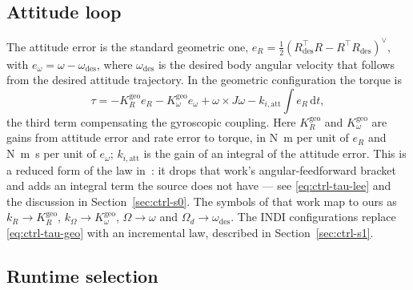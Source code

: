 \subsection{Attitude loop}

The attitude error is the standard geometric one,
$e_R = \tfrac{1}{2}\left(R_{\mathrm{des}}^\top R - R^\top R_{\mathrm{des}}\right)^\vee$, with
$e_\omega = \omega - \omega_{\mathrm{des}}$, where $\omega_{\mathrm{des}}$ is the desired body angular
velocity that follows from the desired attitude trajectory. In the geometric configuration the torque is
%
\begin{equation}
  \tau = -K_R^{\mathrm{geo}} e_R - K_\omega^{\mathrm{geo}} e_\omega + \omega \times J\omega
         - k_{i,\mathrm{att}} \textstyle\int e_R \, \mathrm{d}t,
  \label{eq:ctrl-tau-geo}
\end{equation}
%
the third term compensating the gyroscopic coupling. Here $K_R^{\mathrm{geo}}$ and
$K_\omega^{\mathrm{geo}}$ are gains from attitude error and rate error to torque, in
\si{\newton\metre} per unit of $e_R$ and \si{\newton\metre\second} per unit of $e_\omega$; $k_{i,\mathrm{att}}$ is the gain of an
integral of the attitude error. This is a reduced form of the law
in~\cite{lee2010geometrictracking}: it drops that work's angular-feedforward bracket and adds an
integral term the source does not have --- see \eqref{eq:ctrl-tau-lee} and the discussion in
Section~\ref{sec:ctrl-s0}. The symbols of that work map to ours as $k_R \to K_R^{\mathrm{geo}}$,
$k_\Omega \to K_\omega^{\mathrm{geo}}$, $\Omega \to \omega$ and $\Omega_d \to \omega_{\mathrm{des}}$. The INDI configurations replace
\eqref{eq:ctrl-tau-geo} with an incremental law, described in Section~\ref{sec:ctrl-s1}.

\subsection{Runtime selection}
\label{sec:ctrl-runtime}

